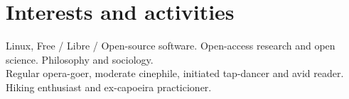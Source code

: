 \documentclass[a4paper,10pt]{article}
\begin{document}

  \vspace{-15pt}
  
  \section{Interests and activities}

    Linux, Free / Libre / Open-source software. Open-access research and open science. Philosophy and sociology. \\
    Regular opera-goer, moderate cinephile, initiated tap-dancer and avid reader. \\
    Hiking enthusiast and ex-capoeira practicioner.
\end{document}
